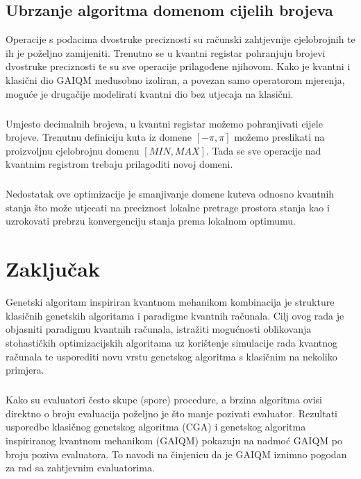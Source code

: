 \documentclass[times, utf8, zavrsni, numeric]{fer}
\begin{document}
\section{Ubrzanje algoritma domenom cijelih brojeva}
Operacije s podacima dvostruke preciznosti su računski zahtjevnije cjelobrojnih te ih je poželjno zamijeniti. Trenutno se u kvantni registar pohranjuju brojevi dvostruke preciznosti te su sve operacije prilagođene njihovom. Kako je kvantni i klasični dio GAIQM međusobno izoliran, a povezan samo operatorom mjerenja, moguće je drugačije modelirati kvantni dio bez utjecaja na klasični.

\paragraph{}
Umjesto decimalnih brojeva, u kvantni registar možemo pohranjivati cijele brojeve. Trenutnu definiciju kuta iz domene $[-\pi, \pi]$ možemo preslikati na proizvoljnu cjelobrojnu domenu $[MIN, MAX]$. Tada se sve operacije nad kvantnim registrom trebaju prilagoditi novoj domeni.

\paragraph{}
Nedostatak ove optimizacije je smanjivanje domene kuteva odnosno kvantnih stanja što može utjecati na preciznost lokalne pretrage prostora stanja kao i uzrokovati prebrzu konvergenciju stanja prema lokalnom optimumu.

\chapter{Zaključak} 
\label{ch:zaključak}
Genetski algoritam inspiriran kvantnom mehanikom kombinacija je strukture klasičnih genetskih algoritama i paradigme kvantnih računala. Cilj ovog rada je objasniti paradigmu kvantnih računala, istražiti mogućnosti oblikovanja stohastičkih optimizacijskih algoritama uz korištenje simulacije rada kvantnog računala te usporediti novu vrstu genetskog algoritma s klasičnim na nekoliko primjera.

\paragraph{}
Kako su evaluatori često skupe (spore) procedure, a brzina algoritma ovisi direktno o broju evaluacija poželjno je što manje pozivati evaluator. Rezultati usporedbe klasičnog genetskog algoritma (CGA) i genetskog algoritma inspiriranog kvantnom mehanikom (GAIQM) pokazuju na nadmoć GAIQM po broju poziva evaluatora. To navodi na činjenicu da je GAIQM iznimno pogodan za rad sa zahtjevnim evaluatorima. 
\end{document}
